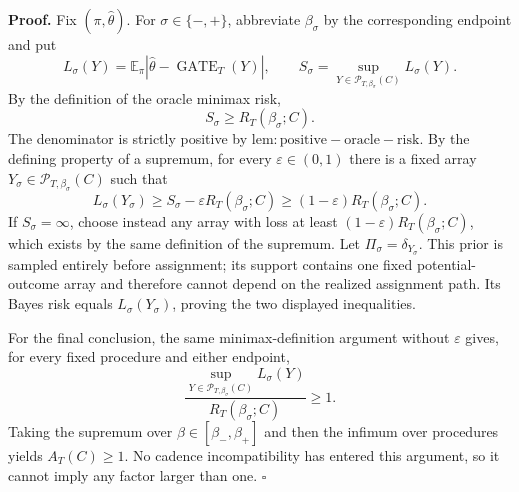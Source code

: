 \textbf{Proof.} Fix \((\pi,\widehat\theta)\). For \(\sigma\in\{-,+\}\), abbreviate \(\beta_\sigma\) by the corresponding endpoint and put
\[
L_\sigma(Y)=\mathbb E_\pi
\left|\widehat\theta-\operatorname{GATE}_T(Y)\right|,
\qquad
S_\sigma=\sup_{Y\in\mathcal P_{T,\beta_\sigma}(C)}L_\sigma(Y).
\]
By the definition of the oracle minimax risk,
\[
S_\sigma\ge R_T(\beta_\sigma;C).
\]
The denominator is strictly positive by \(\mathrm{lem:positive-oracle-risk}\). By the defining property of a supremum, for every \(\varepsilon\in(0,1)\) there is a fixed array \(Y_\sigma\in\mathcal P_{T,\beta_\sigma}(C)\) such that
\[
L_\sigma(Y_\sigma)
\ge S_\sigma-\varepsilon R_T(\beta_\sigma;C)
\ge(1-\varepsilon)R_T(\beta_\sigma;C).
\]
If \(S_\sigma=\infty\), choose instead any array with loss at least \((1-\varepsilon)R_T(\beta_\sigma;C)\), which exists by the same definition of the supremum. Let \(\Pi_\sigma=\delta_{Y_\sigma}\). This prior is sampled entirely before assignment; its support contains one fixed potential-outcome array and therefore cannot depend on the realized assignment path. Its Bayes risk equals \(L_\sigma(Y_\sigma)\), proving the two displayed inequalities.

For the final conclusion, the same minimax-definition argument without \(\varepsilon\) gives, for every fixed procedure and either endpoint,
\[
\frac{\sup_{Y\in\mathcal P_{T,\beta_\sigma}(C)}L_\sigma(Y)}
{R_T(\beta_\sigma;C)}\ge1.
\]
Taking the supremum over \(\beta\in[\beta_-,\beta_+]\) and then the infimum over procedures yields \(A_T(C)\ge1\). No cadence incompatibility has entered this argument, so it cannot imply any factor larger than one. \(\square\)